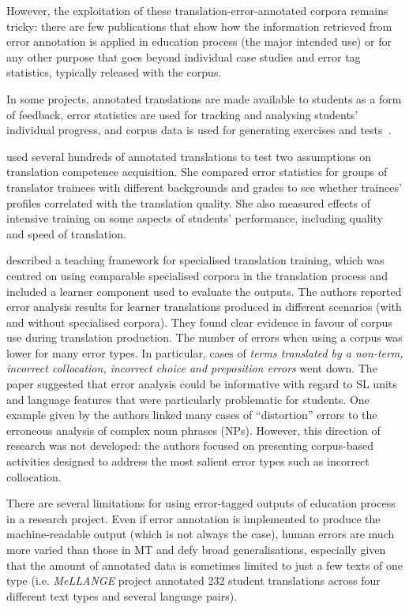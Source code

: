 However, the exploitation of these translation-error-annotated corpora remains tricky: there are few publications that show how the information retrieved from error annotation is applied in education process (the major intended use) or for any other purpose that goes beyond individual case studies and error tag statistics, typically released with the corpus.

In some projects, annotated translations are made available to students as a form of feedback, error statistics are used for tracking and analysing students’ individual progress, and corpus data is used for generating exercises and tests~\cite{Kutuzov2014rltc,Fictumova2017}.

\citet{Wurm2020} used several hundreds of annotated translations to test two assumptions on translation competence acquisition. She compared error statistics for groups of translator trainees with different backgrounds and grades to see whether trainees' profiles correlated with the translation quality. She also measured effects of intensive training on some aspects of students' performance, including quality and speed of translation.

\citet{Kubler2018} described a teaching framework for specialised translation training, which was centred on using comparable specialised corpora in the translation process and included a learner component used to evaluate the outputs. The authors reported error analysis results for learner translations produced in different scenarios (with and without specialised corpora). They found clear evidence in favour of corpus use during translation production. The number of errors when using a corpus was lower for many error types. In particular, cases of \textit{terms translated by a non-term, incorrect collocation, incorrect choice and preposition errors} went down. The paper suggested that error analysis could be informative with regard to SL units and language features that were particularly problematic for students. One example given by the authors linked many cases of ``distortion'' errors to the erroneous analysis of complex noun phrases (NPs). However, this direction of research was not developed: the authors focused on presenting corpus-based activities designed to address the most salient error types such as incorrect collocation. 

There are several limitations for using error-tagged outputs of education process in a research project.
Even if error annotation is implemented to produce the machine-readable output (which is not always the case), human errors are much more varied than those in MT and defy broad generalisations, especially given that the amount of annotated data is sometimes limited to just a few texts of one type (i.e. \textit{MeLLANGE} project annotated 232 student translations across four different text types and several language pairs).

